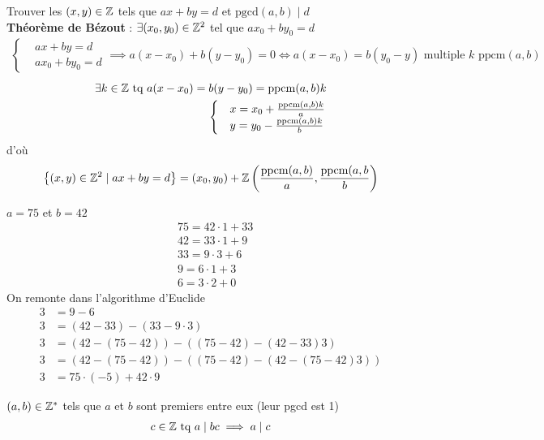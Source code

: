 Trouver les $(x, y) \in \mathbb{Z}$ tels que $ax + by = d$ et $\mathrm{pgcd}(a, b) \mid d$
\\
\textbf{Théorème de Bézout} : $\exists (x_0, y_0) \in \mathbb{Z}^2$ tel que $ax_0 + by_0 = d$
\begin{align*}
\begin{cases}
&ax + by = d \\
&ax_0 + by_0 = d
\end{cases}
\implies 
a(x - x_0) + b(y - y_0) = 0 \iff a(x - x_0) = b(y_0 - y) \text{ multiple  }k \text{ ppcm}(a,b)
\end{align*}
\begin{align*}
\exists k \in \mathbb{Z} \text{ tq } a(x - x_0) = b(y - y_0) = \mathrm{ppcm}(a, b)k \\
\begin{cases}
&x = x_0 + \frac{\mathrm{ppcm}(a, b)k}{a} \\
&y = y_0 - \frac{\mathrm{ppcm}(a,b)k}{b}
\end{cases}
\end{align*}
d'où 
\begin{align*}
\left\{ (x,y) \in \mathbb{Z}^2 \mid ax + by = d \right\} = (x_0, y_0) + \mathbb{Z} \left( \frac{\mathrm{ppcm}(a, b)}{a}, \frac{\mathrm{ppcm}(a, b}{b}\right)
\end{align*}

\begin{exemple}
$a = 75$ et $b = 42$ \\
\begin{align*}
&75 = 42 \cdot 1 + 33 \\
&42 = 33 \cdot 1 + 9 \\
&33 = 9 \cdot 3 + 6 \\
&9 = 6 \cdot 1 + 3\\
&6 = 3 \cdot 2 + 0
\end{align*}
On remonte dans l'algorithme d'Euclide
\begin{align*}
3 &= 9 - 6  \\
3 &= (42 - 33) - (33 - 9 \cdot 3) \\
3 &= (42 - (75 - 42)) - ((75 - 42) - (42 - 33) 3)  \\
3 &= (42 - (75 - 42)) - ((75 - 42) - (42 - (75 - 42)3)) \\
3 &= 75 \cdot (-5) + 42 \cdot 9 
\end{align*}
\end{exemple}

\begin{graybox}
\begin{lemme}
$(a, b) \in \mathbb{Z}^*$ tels que $a$ et $b$ sont premiers entre eux (leur pgcd est 1)
\begin{align*}
c \in \mathbb{Z} \text{ tq } a \mid bc \implies a \mid c
\end{align*}
\end{lemme}
\end{graybox}

